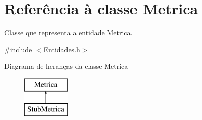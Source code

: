\hypertarget{class_metrica}{
\section{\-Referência à classe \-Metrica}
\label{class_metrica}
}


\-Classe que representa a entidade \hyperlink{class_metrica}{\-Metrica}.  




{\ttfamily \#include $<$\-Entidades.\-h$>$}

\-Diagrama de heranças da classe \-Metrica\begin{figure}[H]
\begin{center}
\leavevmode
\includegraphics[height=2.000000cm]{class_metrica}
\end{center}
\end{figure}

